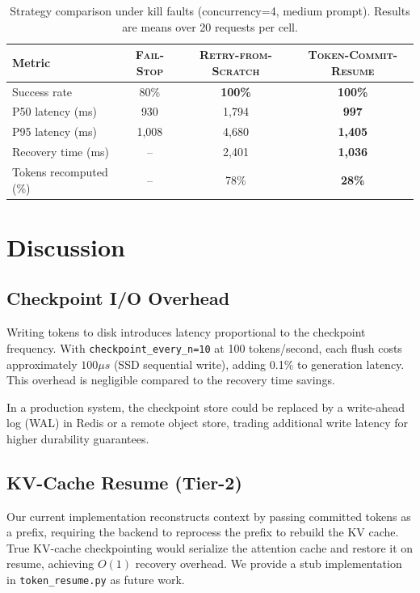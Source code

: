 \documentclass[10pt,twocolumn]{article}
\newcommand{\failstop}{\textsc{Fail-Stop}}
\newcommand{\retry}{\textsc{Retry-from-Scratch}}
\newcommand{\tcr}{\textsc{Token-Commit-Resume}}
\begin{document}
\begin{table}[h]
\centering
\caption{Strategy comparison under kill faults (concurrency=4, medium prompt).
Results are means over 20 requests per cell.}
\label{tab:summary}
\small
\begin{tabular}{lccc}
\toprule
Metric & \failstop & \retry & \tcr \\
\midrule
Success rate & 80\% & \textbf{100\%} & \textbf{100\%} \\
P50 latency (ms) & 930 & 1{,}794 & \textbf{997} \\
P95 latency (ms) & 1{,}008 & 4{,}680 & \textbf{1{,}405} \\
Recovery time (ms) & -- & 2{,}401 & \textbf{1{,}036} \\
Tokens recomputed (\%) & -- & 78\% & \textbf{28\%} \\
\bottomrule
\end{tabular}
\end{table}

\section{Discussion}
\label{sec:discussion}

\subsection{Checkpoint I/O Overhead}

Writing tokens to disk introduces latency proportional to the checkpoint
frequency. With \texttt{checkpoint\_every\_n=10} at 100 tokens/second,
each flush costs approximately $100 \mu s$ (SSD sequential write), adding
0.1\% to generation latency. This overhead is negligible compared to the
recovery time savings.

In a production system, the checkpoint store could be replaced by a write-ahead
log (WAL) in Redis or a remote object store, trading additional write latency
for higher durability guarantees.

\subsection{KV-Cache Resume (Tier-2)}

Our current implementation reconstructs context by passing committed tokens
as a prefix, requiring the backend to reprocess the prefix to rebuild the
KV cache. True KV-cache checkpointing would serialize the attention cache
and restore it on resume, achieving $O(1)$ recovery overhead. We provide
a stub implementation in \texttt{token\_resume.py} as future work.
\end{document}
